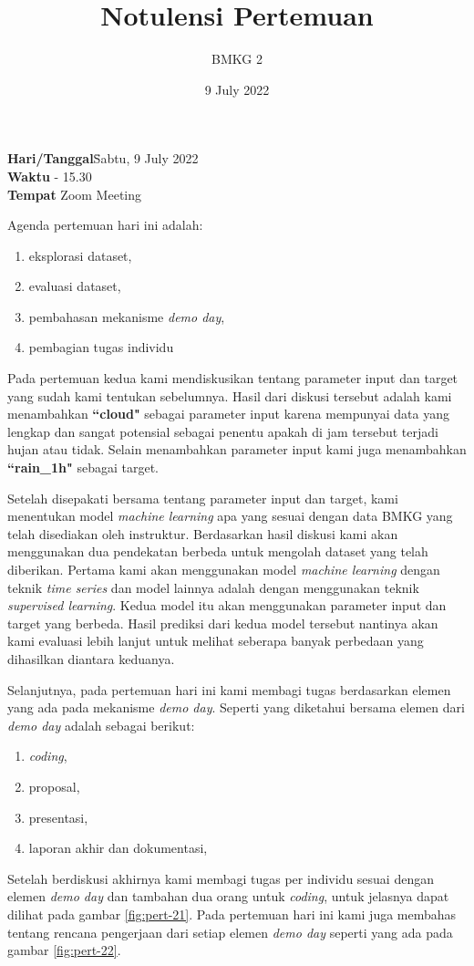 \documentclass[12pt, a4paper]{article}
\title{Notulensi Pertemuan}
\author{BMKG 2}
\date{9 July 2022}
\begin{document}
\maketitle

\begin{tabbing}
\textbf{Hari/Tanggal}\quad\= Sabtu, 9 July 2022 \\
\textbf{Waktu}  - 15.30 \\
\textbf{Tempat}\> Zoom Meeting
\end{tabbing}

Agenda pertemuan hari ini adalah:
\begin{enumerate}
\item eksplorasi dataset,
\item evaluasi dataset,
\item pembahasan mekanisme \emph{demo day},
\item pembagian tugas individu
\end{enumerate}

\bigskip 
Pada pertemuan kedua kami mendiskusikan tentang parameter input dan target yang sudah kami tentukan sebelumnya. Hasil dari diskusi tersebut adalah kami menambahkan \textbf{``cloud"} sebagai parameter input karena mempunyai data yang lengkap dan sangat potensial sebagai penentu apakah di jam tersebut terjadi hujan atau tidak. Selain menambahkan parameter input kami juga menambahkan \textbf{``rain\_1h"} sebagai target.

\medskip
Setelah disepakati bersama tentang parameter input dan target, kami menentukan model \emph{machine learning} apa yang sesuai dengan data BMKG yang telah disediakan oleh instruktur. Berdasarkan hasil diskusi kami akan menggunakan dua pendekatan berbeda untuk mengolah dataset yang telah diberikan. Pertama kami akan menggunakan model \emph{machine learning} dengan teknik \emph{time series} dan model lainnya adalah dengan menggunakan teknik \emph{supervised learning}. Kedua model itu akan menggunakan parameter input dan target yang berbeda. Hasil prediksi dari kedua model tersebut nantinya akan kami evaluasi lebih lanjut untuk melihat seberapa banyak perbedaan yang dihasilkan diantara keduanya.

\medskip
Selanjutnya, pada pertemuan hari ini kami membagi tugas berdasarkan elemen yang ada pada mekanisme \emph{demo day}. Seperti yang diketahui bersama elemen dari \emph{demo day} adalah sebagai berikut:
\begin{enumerate}
\item \emph{coding},
\item proposal,
\item presentasi,
\item laporan akhir dan dokumentasi,
\end{enumerate}
Setelah berdiskusi akhirnya kami membagi tugas per individu sesuai dengan elemen \emph{demo day} dan tambahan dua orang untuk \emph{coding}, untuk jelasnya dapat dilihat pada gambar \ref{fig:pert-21}. Pada pertemuan hari ini kami juga membahas tentang rencana pengerjaan dari setiap elemen \emph{demo day} seperti yang ada pada gambar \ref{fig:pert-22}.
\end{document}
